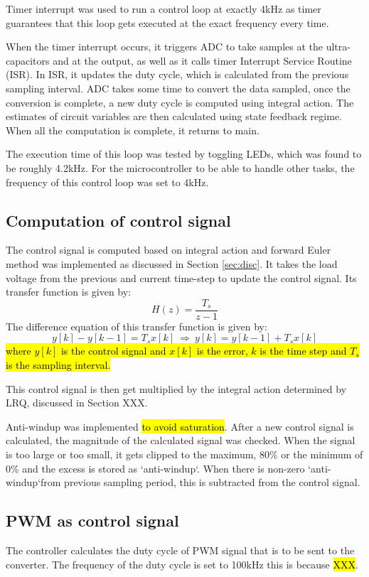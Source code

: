 Timer interrupt was used to run a control loop at exactly 4kHz as timer guarantees that this loop gets executed at the exact frequency every time. 

When the timer interrupt occurs, it triggers ADC to take samples at the ultra-capacitors and at the output, as well as it calls timer Interrupt Service Routine (ISR). In ISR, it updates the duty cycle, which is calculated from the previous sampling interval. ADC takes some time to convert the data sampled, once the conversion is complete, a new duty cycle is computed using integral action. The estimates of circuit variables are then calculated using state feedback regime. When all the computation is complete, it returns to main. 

The execution time of this loop was tested by toggling LEDs, which was found to be roughly 4.2kHz. For the microcontroller to be able to handle other tasks, the frequency of this control loop was set to 4kHz. 

\subsection{Computation of control signal}
The control signal is computed based on integral action and forward Euler method was implemented as discussed in Section \ref{sec:disc}. It takes the load voltage from the previous and current time-step to update the control signal. Its transfer function is given by:
\[
    H(z) = \frac{T_s}{z-1}
\]
The difference equation of this transfer function is given by:
\[
    y[k] - y[k-1] = T_s x[k] \: \Longrightarrow \: y[k] = y[k-1] + T_s x[k]
\]
\hl{where $y[k]$ is the control signal and $x[k]$ is the error, $k$ is the time step and $T_s$ is the sampling interval.}

This control signal is then get multiplied by the integral action determined by LRQ, discussed in Section XXX.

Anti-windup was implemented \hl{to avoid saturation}. After a new control signal is calculated, the magnitude of the calculated signal was checked. When the signal is too large or too small, it gets clipped to the maximum, 80\% or the minimum of 0\% and the excess is stored as \lq anti-windup\lq. When there is non-zero \lq anti-windup\lq from previous sampling period, this is subtracted from the control signal. 

\subsection{PWM as control signal}
The controller calculates the duty cycle of PWM signal that is to be sent to the converter. The frequency of the duty cycle is set to 100kHz this is because \hl{XXX}. 


